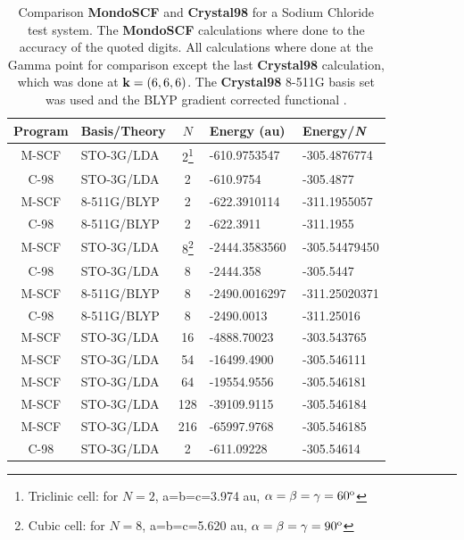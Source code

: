 \documentclass[prb,aps,nobibnotes,twocolumn,doublespace,twocolumngrid,superbib]{revtex4}
\begin{document}
\begin{table}
\caption{Comparison \textbf{MondoSCF} and \textbf{Crystal98} for a 
Sodium Chloride test system. The \textbf{MondoSCF} calculations where done to
the accuracy of the quoted digits. All calculations where done at the Gamma point
for comparison except the last \textbf{Crystal98} calculation, which was done at ${\bf k}=(6,6,6)$.
The \textbf{Crystal98} 8-511G  basis set was used \cite{C98Basis} and the BLYP gradient corrected 
functional \cite{Becke93}.}
\label{table:ComToCrystal98_1}
 
\begin{tabular}{clcll}
\hline 
Program&
Basis/Theory&
\( N \)&
Energy  (au)&
Energy/{\it N}\\
\hline
\hline 
M-SCF &
STO-3G/LDA&
2\footnote[1]{Triclinic cell: for $N=2$, a=b=c=3.974 au, $\alpha=\beta=\gamma=60^{{\rm o}}$}&
-610.9753547&
-305.4876774\\
C-98&
STO-3G/LDA&
2\footnotemark[1]&
-610.9754&
-305.4877\\
M-SCF&
8-511G/BLYP&
2\footnotemark[1]&
-622.3910114&
-311.1955057\\
C-98&
8-511G/BLYP&
2\footnotemark[1]&
-622.3911&
-311.1955\\
\hline 
M-SCF&
STO-3G/LDA&
8\footnote[2]{Cubic cell: for $N=8$, a=b=c=5.620 au, $\alpha=\beta=\gamma=90^{{\rm o}}$}&
-2444.3583560&
-305.54479450\\
C-98&
STO-3G/LDA&
8\footnotemark[2]&
-2444.358&
-305.5447\\
M-SCF&
8-511G/BLYP&
8\footnotemark[2]&
-2490.0016297&
-311.25020371\\
C-98&
8-511G/BLYP&
8\footnotemark[2]&
-2490.0013&
-311.25016 \\
\hline 
M-SCF&
STO-3G/LDA&
16\footnotemark[1]&
-4888.70023&
-303.543765\\
M-SCF&
STO-3G/LDA&
54\footnotemark[1]&
-16499.4900&
-305.546111\\
M-SCF&
STO-3G/LDA&
64\footnotemark[2]&
-19554.9556&
-305.546181\\
M-SCF&
STO-3G/LDA&
128\footnotemark[1]&
-39109.9115&
-305.546184\\
M-SCF&
STO-3G/LDA&
216\footnotemark[2] &
-65997.9768&
-305.546185\\
\hline
\,\,C-98\,\,&
STO-3G/LDA\,\,&
\,\,2\footnotemark[1]\,\,&
-611.09228\,\,\,\,\,\,\,\,\,\,\,&
-305.54614\\
\hline
\end{tabular}
\end{table}
%
%
%
\end{document}
